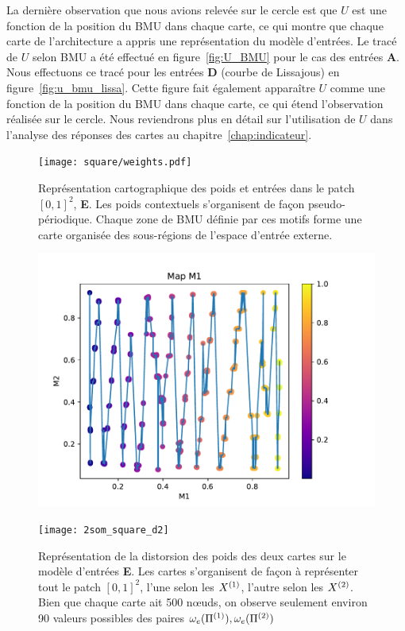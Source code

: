 \documentclass[../main]{subfiles}
\begin{document}
La dernière observation que nous avions relevée sur le cercle est que $U$ est une fonction de la position du BMU dans chaque carte, ce qui montre que chaque carte de l'architecture a appris une représentation du modèle d'entrées. Le tracé de $U$ selon BMU a été effectué en figure~\ref{fig:U_BMU} pour le cas des entrées \textbf{A}.
Nous effectuons ce tracé pour les entrées \textbf{D} (courbe de Lissajous) en figure~\ref{fig:u_bmu_lissa}. 
Cette figure fait également apparaître $U$ comme une fonction de la position du BMU dans chaque carte, ce qui étend l'observation réalisée sur le cercle.
Nous reviendrons plus en détail sur l'utilisation de $U$ dans l'analyse des réponses des cartes au chapitre~\ref{chap:indicateur}.

 \begin{figure}
 \begin{minipage}{\textwidth}
	\centering\texttt{[image: square/weights.pdf]}
	\caption{Représentation cartographique des poids et entrées dans le patch $[0,1]^2$, \textbf{E}. Les poids contextuels s'organisent de façon pseudo-périodique. Chaque zone de BMU définie par ces motifs forme une carte organisée des sous-régions de l'espace d'entrée externe. \label{fig:ind}}

	\hfill\begin{minipage}{0.4\textwidth}
		\includegraphics[width=\textwidth]{2som_square_d}
	\end{minipage}
	\begin{minipage}{0.4\textwidth}
		\texttt{[image: 2som\_square\_d2]}
	\end{minipage}\hfill
	\caption{Représentation de la distorsion des poids des deux cartes sur le modèle d'entrées \textbf{E}. Les cartes s'organisent de façon à représenter tout le patch $[0,1]^2$, l'une selon les $X^{({1})}$, l'autre selon les $X^{({2})}$. Bien que chaque carte ait 500 n\oe{}uds, on observe seulement environ 90 valeurs possibles des paires $\omega_e(\Pi^{({1})}),\omega_e(\Pi^{({2})})$ \label{fig:2som_p_d}}
	

\end{minipage}
\end{figure}
\end{document}
